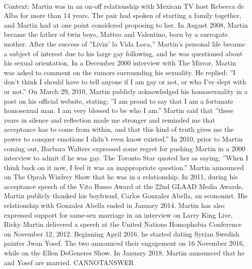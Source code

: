 \documentclass[11pt,a4paper, onecolumn]{article}
\begin{document}
\\ Context: Martin was in an on-off relationship with Mexican TV host Rebecca de Alba for more than 14 years. The pair had spoken of starting a family together, and Martin had at one point considered proposing to her. In August 2008, Martin became the father of twin boys, Matteo and Valentino, born by a surrogate mother. After the success of ''Livin' la Vida Loca,'' Martin's personal life became a subject of interest due to his large gay following, and he was questioned about his sexual orientation. In a December 2000 interview with The Mirror, Martin was asked to comment on the rumors surrounding his sexuality. He replied: ''I don't think I should have to tell anyone if I am gay or not, or who I've slept with or not.'' On March 29, 2010, Martin publicly acknowledged his homosexuality in a post on his official website, stating: ''I am proud to say that I am a fortunate homosexual man. I am very blessed to be who I am.'' Martin said that ''these years in silence and reflection made me stronger and reminded me that acceptance has to come from within, and that this kind of truth gives me the power to conquer emotions I didn't even know existed.'' In 2010, prior to Martin coming out, Barbara Walters expressed some regret for pushing Martin in a 2000 interview to admit if he was gay. The Toronto Star quoted her as saying, ''When I think back on it now, I feel it was an inappropriate question.'' Martin announced on The Oprah Winfrey Show that he was in a relationship. In 2011, during his acceptance speech of the Vito Russo Award at the 22nd GLAAD Media Awards, Martin publicly thanked his boyfriend, Carlos Gonzalez Abella, an economist. His relationship with Gonzalez Abella ended in January 2014. Martin has also expressed support for same-sex marriage in an interview on Larry King Live. Ricky Martin delivered a speech at the United Nations Homophobia Conference on November 12, 2012. Beginning April 2016, he started dating Syrian Swedish painter Jwan Yosef. The two announced their engagement on 16 November 2016, while on the Ellen DeGeneres Show. In January 2018, Martin announced that he and Yosef are married. CANNOTANSWER
\end{document}
